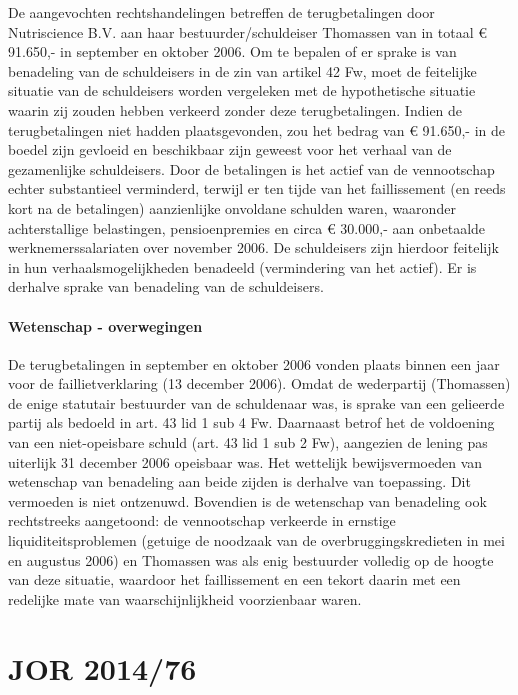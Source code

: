 \documentclass[
  dutch,
  a4paper,
]{article}
\begin{document}
De aangevochten rechtshandelingen betreffen de terugbetalingen door Nutriscience B.V. aan haar bestuurder/schuldeiser Thomassen van in totaal € 91.650,- in september en oktober 2006. Om te bepalen of er sprake is van benadeling van de schuldeisers in de zin van artikel 42 Fw, moet de feitelijke situatie van de schuldeisers worden vergeleken met de hypothetische situatie waarin zij zouden hebben verkeerd zonder deze terugbetalingen. Indien de terugbetalingen niet hadden plaatsgevonden, zou het bedrag van € 91.650,- in de boedel zijn gevloeid en beschikbaar zijn geweest voor het verhaal van de gezamenlijke schuldeisers. Door de betalingen is het actief van de vennootschap echter substantieel verminderd, terwijl er ten tijde van het faillissement (en reeds kort na de betalingen) aanzienlijke onvoldane schulden waren, waaronder achterstallige belastingen, pensioenpremies en circa € 30.000,- aan onbetaalde werknemerssalariaten over november 2006. De schuldeisers zijn hierdoor feitelijk in hun verhaalsmogelijkheden benadeeld (vermindering van het actief). Er is derhalve sprake van benadeling van de schuldeisers.

\paragraph{Wetenschap - overwegingen}\label{wetenschap---overwegingen-80}

De terugbetalingen in september en oktober 2006 vonden plaats binnen een jaar voor de faillietverklaring (13 december 2006). Omdat de wederpartij (Thomassen) de enige statutair bestuurder van de schuldenaar was, is sprake van een gelieerde partij als bedoeld in art. 43 lid 1 sub 4 Fw. Daarnaast betrof het de voldoening van een niet-opeisbare schuld (art. 43 lid 1 sub 2 Fw), aangezien de lening pas uiterlijk 31 december 2006 opeisbaar was. Het wettelijk bewijsvermoeden van wetenschap van benadeling aan beide zijden is derhalve van toepassing. Dit vermoeden is niet ontzenuwd. Bovendien is de wetenschap van benadeling ook rechtstreeks aangetoond: de vennootschap verkeerde in ernstige liquiditeitsproblemen (getuige de noodzaak van de overbruggingskredieten in mei en augustus 2006) en Thomassen was als enig bestuurder volledig op de hoogte van deze situatie, waardoor het faillissement en een tekort daarin met een redelijke mate van waarschijnlijkheid voorzienbaar waren.

\newpage


\section{JOR 2014/76}\label{jor-201476}
\end{document}
